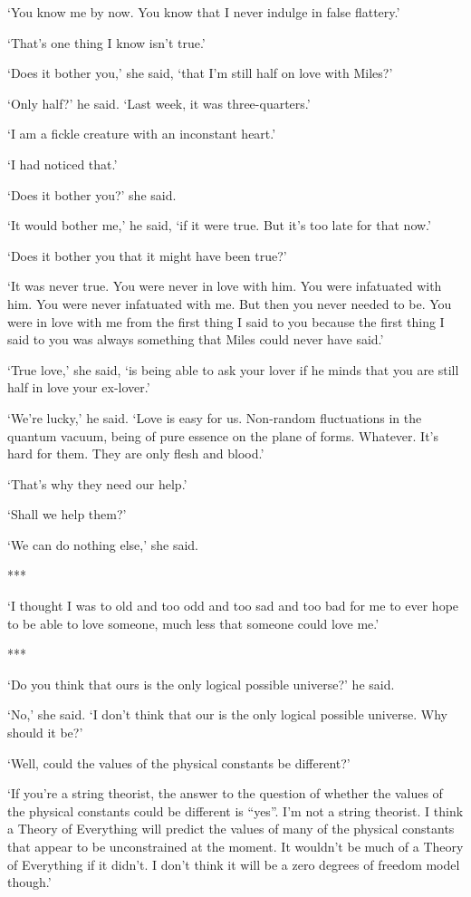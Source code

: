 `You know me by now. You know that I never indulge in false flattery.'

`That's one thing I know isn't true.'

`Does it bother you,' she said, `that I'm still half on love with Miles?'

`Only half?' he said. `Last week, it was three-quarters.'

`I am a fickle creature with an inconstant heart.'

`I had noticed that.'

`Does it bother you?' she said.

`It would bother me,' he said, `if it were true. But it's too late for that now.'

`Does it bother you that it might have been true?'

`It was never true. You were never in love with him. You were
infatuated with him. You were never infatuated with me. But then you
never needed to be. You were in love with
me from the first thing I said to you because the first thing I
said to you was always something that Miles could never have
said.'

`True love,' she said, `is being able to ask your lover if he minds that you
are still half in love your ex-lover.'

`We're lucky,' he said. `Love is easy for us. Non-random fluctuations in the
quantum vacuum, being of pure essence on the plane of forms. Whatever. It's hard for them. They are only flesh and blood.'

`That's why they need our help.'

`Shall we help them?'

`We can do nothing else,' she said.

***

`I thought I was to old and too odd and too sad and too bad for me to
ever hope to be able to love someone, much less that someone could
love me.'

***

`Do you think that ours is the only logical possible universe?' he said.

`No,' she said. `I don't think that our is the
only logical possible universe. Why should it be?'

`Well, could the values of the physical constants be different?'

`If you're a string theorist, the answer to the question of whether
the values of the physical constants could be different is ``yes''. I'm
not a string theorist. I think a Theory of Everything will predict
the values of many of the physical constants that appear to be
unconstrained at the moment. It wouldn't be much of a Theory of
Everything if it didn't. I don't think it will be a zero degrees of
freedom model though.'

